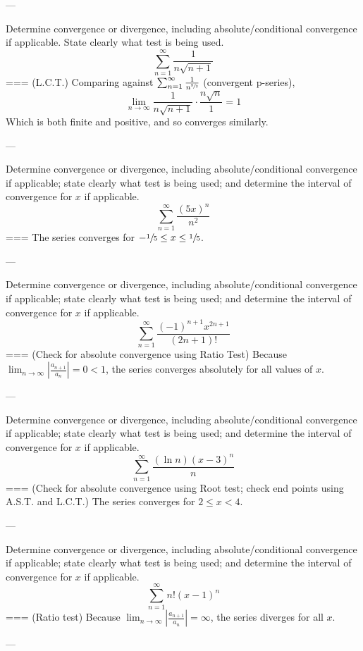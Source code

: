 ---

Determine convergence or divergence, including absolute/conditional convergence
if applicable. State clearly what test is being used.
\[\sum_{n=1}^\infty \frac{1}{n\sqrt{n+1}}\]
===
(L.C.T.) Comparing against \(\sum_{n=1}^\infty \frac{1}{n^{\sfrac{3}{2}}}\)
(convergent p-series),
\[\lim_{n\to\infty}\frac{1}{n\sqrt{n+1}}\cdot\frac{n\sqrt{n}}{1}=1\]
Which is both finite and positive, and so converges similarly.

---

Determine convergence or divergence, including absolute/conditional convergence
if applicable; state clearly what test is being used; and determine the interval
of convergence for \(x\) if applicable.
\[\sum_{n=1}^\infty\frac{{(5x)}^n}{n^2}\]
===
The series converges for \(-\sfrac{1}{5}\leq x\leq\sfrac{1}{5}\).

---

Determine convergence or divergence, including absolute/conditional convergence
if applicable; state clearly what test is being used; and determine the interval
of convergence for \(x\) if applicable.
\[\sum_{n=1}^\infty\frac{{(-1)}^{n+1}x^{2n+1}}{(2n+1)!}\]
===
(Check for absolute convergence using Ratio Test)
Because \(\lim_{n\to\infty}\left|\frac{a_{n+1}}{a_n}\right|=0<1\), the series
converges absolutely for all values of \(x\).

---

Determine convergence or divergence, including absolute/conditional convergence
if applicable; state clearly what test is being used; and determine the interval
of convergence for \(x\) if applicable.
\[\sum_{n=1}^\infty\frac{(\ln n){(x-3)}^n}{n}\]
===
(Check for absolute convergence using Root test; check end points using A.S.T.
and L.C.T.) The series converges for \(2\leq x<4\).

---

Determine convergence or divergence, including absolute/conditional convergence
if applicable; state clearly what test is being used; and determine the interval
of convergence for \(x\) if applicable.
\[\sum_{n=1}^\infty n!{(x-1)}^n\]
===
(Ratio test) Because
\(\lim_{n\to\infty}\left|\frac{a_{n+1}}{a_n}\right|=\infty\), the series
diverges for all \(x\).

---

